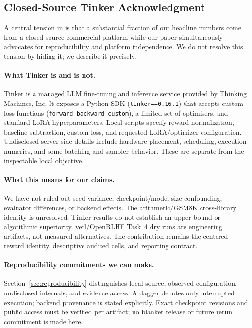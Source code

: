 \subsection{Closed-Source Tinker Acknowledgment}
\label{sec:tinker_closed}

A central tension in \ours{} is that a substantial fraction of our
headline numbers come from a closed-source commercial platform while our
paper simultaneously advocates for reproducibility and platform
independence. We do not resolve this tension by hiding it; we describe
it precisely.

\paragraph{What Tinker is and is not.}
Tinker \cite{thinkingmachines2024tinker} is a managed LLM fine-tuning and
inference service provided by Thinking Machines, Inc. It exposes a Python
SDK (\texttt{tinker==0.16.1}) that accepts custom loss functions
(\texttt{forward\_backward\_custom}), a limited set of optimisers, and
standard LoRA hyperparameters. Local scripts specify reward normalization, baseline subtraction, custom loss,
and requested LoRA/optimizer configuration. Undisclosed server-side details
include hardware placement, scheduling, execution numerics, and some batching
and sampler behavior. These are separate from the inspectable local objective.

\paragraph{What this means for our claims.}
We have not ruled out seed variance, checkpoint/model-size confounding, evaluator
differences, or backend effects. The arithmetic/GSM8K cross-library identity is
unresolved. Tinker results do not establish an upper bound or algorithmic
superiority. verl/OpenRLHF Task~4 dry runs are engineering artifacts, not
measured alternatives. The contribution remains the centered-reward identity,
descriptive audited cells, and reporting contract.

\paragraph{Reproducibility commitments we can make.}
Section~\ref{sec:reproducibility} distinguishes local source, observed
configuration, undisclosed internals, and evidence access. A dagger denotes only
interrupted execution; backend provenance is stated explicitly. Exact checkpoint
revisions and public access must be verified per artifact; no blanket release
or future rerun commitment is made here.

